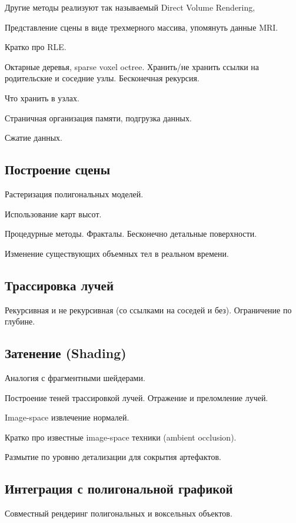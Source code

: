 \documentclass[a4paper,12pt,oneside]{article}
\begin{document}
Другие методы реализуют так называемый Direct Volume Rendering, 

Представление сцены в виде трехмерного массива, упомянуть данные MRI.

Кратко про RLE.

Октарные деревья, sparse voxel octree. Хранить/не хранить ссылки на родительские и соседние узлы. Бесконечная рекурсия.

Что хранить в узлах.

Страничная организация памяти, подгрузка данных.

Сжатие данных.

\subsection{Построение сцены}

Растеризация полигональных моделей.

Использование карт высот.

Процедурные методы. Фракталы. Бесконечно детальные поверхности.

Изменение существующих объемных тел в реальном времени.

\subsection{Трассировка лучей}

Рекурсивная и не рекурсивная (со ссылками на соседей и без). Ограничение по глубине.

\subsection{Затенение (Shading)}

Аналогия с фрагментными шейдерами.

Построение теней трассировкой лучей. Отражение и преломление лучей.

Image-space извлечение нормалей.

Кратко про известные image-space техники (ambient occlusion).

Размытие по уровню детализации для сокрытия артефактов.

\subsection{Интеграция с полигональной графикой}

Совместный рендеринг полигональных и воксельных объектов.
\end{document}
